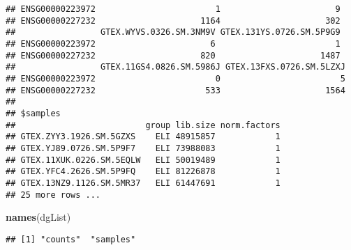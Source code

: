 \documentclass[
]{article}
\newenvironment{Shaded}{\begin{snugshade}}{\end{snugshade}}
\newcommand{\KeywordTok}[1]{\textcolor[rgb]{0.13,0.29,0.53}{\textbf{#1}}}
\newcommand{\NormalTok}[1]{#1}
\newcommand{\OperatorTok}[1]{\textcolor[rgb]{0.81,0.36,0.00}{\textbf{#1}}}
\begin{document}
\begin{verbatim}
## ENSG00000223972                        1                       9
## ENSG00000227232                     1164                     302
##                 GTEX.WYVS.0326.SM.3NM9V GTEX.131YS.0726.SM.5P9G9
## ENSG00000223972                       6                        1
## ENSG00000227232                     820                     1487
##                 GTEX.11GS4.0826.SM.5986J GTEX.13FXS.0726.SM.5LZXJ
## ENSG00000223972                        0                        5
## ENSG00000227232                      533                     1564
## 
## $samples
##                          group lib.size norm.factors
## GTEX.ZYY3.1926.SM.5GZXS    ELI 48915857            1
## GTEX.YJ89.0726.SM.5P9F7    ELI 73988083            1
## GTEX.11XUK.0226.SM.5EQLW   ELI 50019489            1
## GTEX.YFC4.2626.SM.5P9FQ    ELI 81226878            1
## GTEX.13NZ9.1126.SM.5MR37   ELI 61447691            1
## 25 more rows ...
\end{verbatim}

\begin{Shaded}
\begin{Highlighting}[]
\KeywordTok{names}\NormalTok{(dgList)}
\end{Highlighting}
\end{Shaded}

\begin{verbatim}
## [1] "counts"  "samples"
\end{verbatim}

\begin{Shaded}
\end{Shaded}
\end{document}
